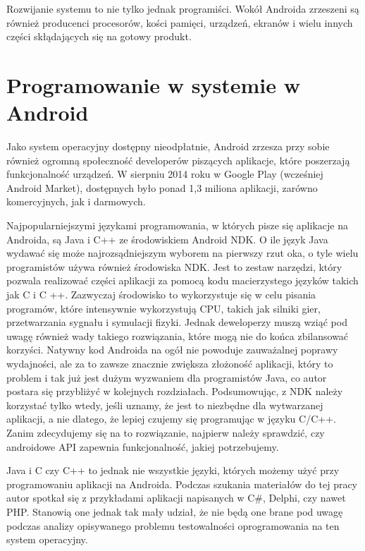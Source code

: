 Rozwijanie systemu to nie tylko jednak programiści. Wokół Androida zrzeszeni są również producenci procesorów, kości pamięci, urządzeń, ekranów i wielu innych części skłądających się na gotowy produkt.

\section{Programowanie w systemie w Android}
Jako system operacyjny dostępny nieodpłatnie, Android zrzesza przy sobie również ogromną społeczność developerów piszących aplikacje, które poszerzają funkcjonalność urządzeń. W sierpniu 2014 roku w Google Play (wcześniej Android Market), dostępnych było ponad 1,3 miliona aplikacji, zarówno komercyjnych, jak i darmowych.

Najpopularniejszymi językami programowania, w których pisze się aplikacje na Androida, są Java i C++ ze środowiskiem Android NDK. O ile język Java wydawać się może najrozsądniejszym wyborem na pierwszy rzut oka, o tyle wielu programistów używa również środowiska NDK. Jest to zestaw narzędzi, który pozwala realizować części aplikacji za pomocą kodu macierzystego języków takich jak C i C ++. Zazwyczaj środowisko to wykorzystuje się w celu pisania programów, które intensywnie wykorzystują CPU, takich jak silniki gier, przetwarzania sygnału i symulacji fizyki. Jednak deweloperzy muszą wziąć pod uwagę również wady takiego rozwiązania, które mogą nie do końca zbilansować korzyści. Natywny kod Androida na ogół nie powoduje zauważalnej poprawy wydajności, ale za to zawsze znacznie zwiększa złożoność aplikacji, który to problem i tak już jest dużym wyzwaniem dla programistów Java, co autor postara się przybliżyć w kolejnych rozdziałach. Podsumowując, z NDK należy korzystać tylko wtedy, jeśli uznamy, że jest to niezbędne dla wytwarzanej aplikacji, a nie dlatego, że lepiej czujemy się programując w języku C/C++. Zanim zdecydujemy się na to rozwiązanie, najpierw należy sprawdzić, czy androidowe API zapewnia funkcjonalność, jakiej potrzebujemy.

Java i C czy C++ to jednak nie wszystkie języki, których możemy użyć przy programowaniu aplikacji na Androida. Podczas szukania materiałów do tej pracy autor spotkał się z przykładami aplikacji napisanych w C\#, Delphi, czy nawet PHP. Stanowią one jednak tak mały udział, że nie będą one brane pod uwagę podczas analizy opisywanego problemu testowalności oprogramowania na ten system operacyjny.




